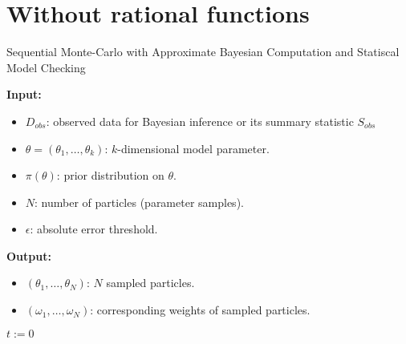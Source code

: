 \section{Without rational functions}
\begin{algorithm}[H]
    \caption{Sequential Monte-Carlo with Approximate Bayesian Computation and Statiscal Model Checking}
    \label{smcabcsmc-alg}
    \hspace*{\algorithmicindent} \textbf{Input:}
    \begin{itemize}
        \item $D_{obs}$: observed data for Bayesian inference or its summary statistic $S_{obs}$
        \item $\theta=(\theta_1,\ldots,\theta_k)$: $k$-dimensional model parameter.
        \item $\pi(\theta)$: prior distribution on $\theta$.
        \item $N$: number of particles (parameter samples).
        \item $\epsilon$: absolute error threshold.
    \end{itemize}
    \hspace*{\algorithmicindent} \textbf{Output:}
    \begin{itemize}
        \item $(\theta_1,\ldots,\theta_N)$: $N$ sampled particles.
        \item $(\omega_1,\ldots,\omega_N)$: corresponding weights of sampled particles.
    \end{itemize}
    \begin{algorithmic}[1]
        \State $t:=0$
        \EndWhile
        \EndProcedure
    \end{algorithmic}
\end{algorithm}

